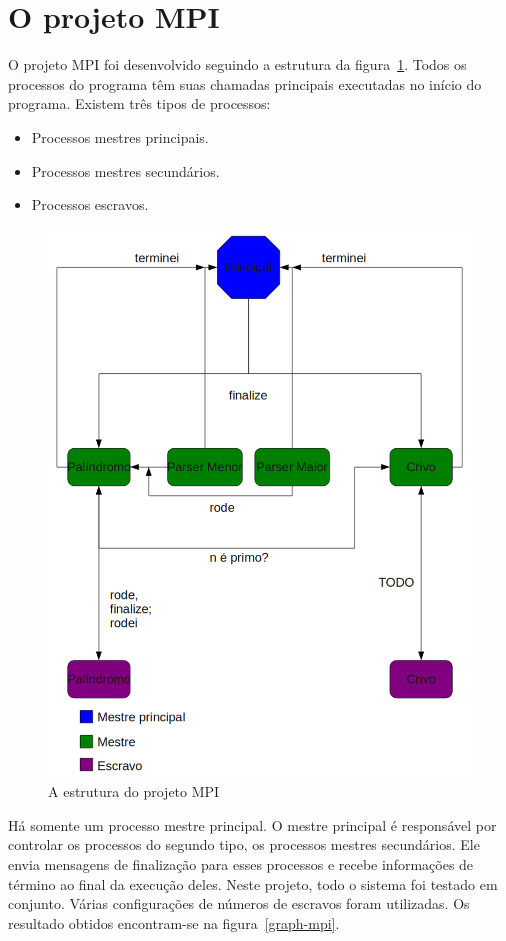 \documentclass[a4paper]{article}
\begin{document}
\section{O projeto MPI}
\indent \indent O projeto MPI foi desenvolvido seguindo a estrutura da figura~\ref{pic-mpi}. Todos os processos do programa têm suas chamadas principais executadas no início do programa. Existem três tipos de processos:
\begin{itemize}
	\item Processos mestres principais.
	\item Processos mestres secundários.
	\item Processos escravos.
\end{itemize}
\begin{figure}
	\includegraphics[scale=0.5]{pic-mpi}
	\caption{A estrutura do projeto MPI}
	\label{pic-mpi}
\end{figure}
\indent \indent Há somente um processo mestre principal. O mestre principal é responsável por controlar os processos do segundo tipo, os processos mestres secundários. Ele envia mensagens de finalização para esses processos e recebe informações de término ao final da execução deles. Neste projeto, todo o sistema foi testado em conjunto. Várias configurações de números de escravos foram utilizadas. Os resultado obtidos encontram-se na figura~\ref{graph-mpi}.
\end{document}
